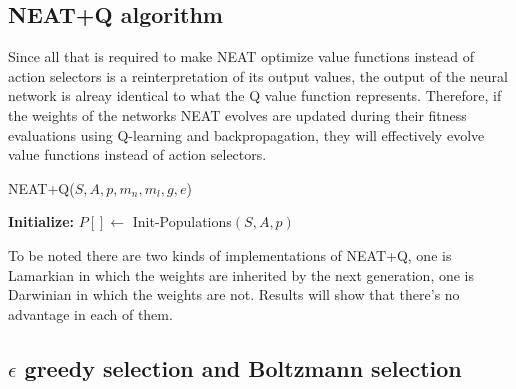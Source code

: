 \documentclass{article}
\begin{document}
\subsection{NEAT+Q algorithm}

Since all that is required to make NEAT optimize value functions instead of action selectors is a reinterpretation of its output values, the output of
the neural network is alreay identical to what the Q value function represents. Therefore, if the weights of the networks NEAT evolves are updated during their fitness evaluations using Q-learning and backpropagation, 
they will effectively evolve value functions instead of action selectors. 

\begin{algorithm}[H]
  
  {\tiny\caption{NEAT+Q($S, A, p , m_n, m_l, g, e$)}}
  \textbf{Initialize:} $P[] \leftarrow$ Init-Populations$(S,A,p)$ \;    
  \end{algorithm}

  To be noted there are two kinds of implementations of NEAT+Q, one is Lamarkian in which the weights are inherited by the next generation, one is Darwinian in which
  the weights are not. Results will show that there's no advantage in each of them.



\subsection{$\epsilon$ greedy selection and Boltzmann selection}
\end{document}
